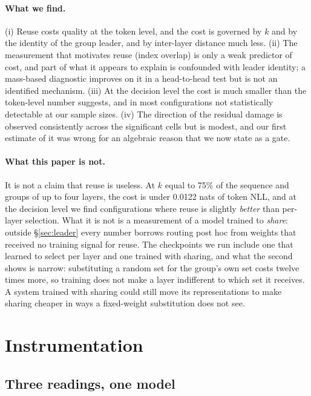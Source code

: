 \documentclass[10pt]{article}
\begin{document}
\paragraph{What we find.}
(i) Reuse costs quality at the token level, and the cost is governed by $k$ and
by the identity of the group leader, and by inter-layer distance much less.
(ii) The measurement that motivates reuse (index overlap) is only a weak
predictor of cost, and part of what it appears to explain is confounded with
leader identity; a mass-based diagnostic improves on it in a head-to-head test
but is not an identified mechanism.
(iii) At the decision level the cost is much smaller than the token-level
number suggests, and in most configurations not statistically detectable at
our sample sizes.
(iv) The direction of the residual damage is observed consistently across the
significant cells but is modest, and our first estimate of it was wrong for an
algebraic reason that we now state as a gate.

\paragraph{What this paper is not.}
It is not a claim that reuse is useless. At $k$ equal to 75\% of the sequence
and groups of up to four layers, the cost is under 0.0122 nats of token
NLL, and at the decision level we find configurations where reuse is slightly
\emph{better} than per-layer selection. What it is not is a measurement of a
model trained to \emph{share}: outside \S\ref{sec:leader} every number borrows
routing post hoc from weights that received no training signal for reuse. The
checkpoints we run include one that learned to select per layer and one trained
with sharing, and what the second shows is narrow: substituting a random set for
the group's own set costs twelve times more, so training does not make a layer
indifferent to which set it receives. A system trained with sharing could still
move its representations to make sharing cheaper in ways a fixed-weight
substitution does not see.

\section{Instrumentation}

\subsection{Three readings, one model}
\end{document}

